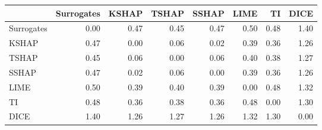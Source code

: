 \begin{tabular}{lrrrrrrr}
\toprule
{} &  Surrogates &  KSHAP &  TSHAP &  SSHAP &  LIME &    TI &  DICE \\
\midrule
Surrogates &        0.00 &   0.47 &   0.45 &   0.47 &  0.50 &  0.48 &  1.40 \\
KSHAP      &        0.47 &   0.00 &   0.06 &   0.02 &  0.39 &  0.36 &  1.26 \\
TSHAP      &        0.45 &   0.06 &   0.00 &   0.06 &  0.40 &  0.38 &  1.27 \\
SSHAP      &        0.47 &   0.02 &   0.06 &   0.00 &  0.39 &  0.36 &  1.26 \\
LIME       &        0.50 &   0.39 &   0.40 &   0.39 &  0.00 &  0.48 &  1.32 \\
TI         &        0.48 &   0.36 &   0.38 &   0.36 &  0.48 &  0.00 &  1.30 \\
DICE       &        1.40 &   1.26 &   1.27 &   1.26 &  1.32 &  1.30 &  0.00 \\
\bottomrule
\end{tabular}
